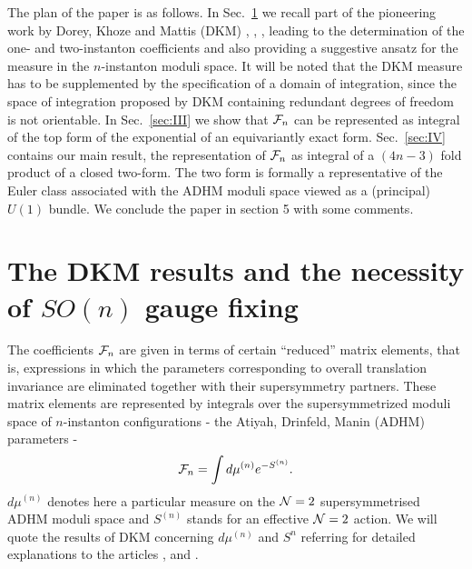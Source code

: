 \documentclass[a4paper,12pt]{article}
\begin{document}
The plan of the paper is as follows. In Sec.~\ref{sec:II} we recall 
part of the pioneering work by Dorey, 
Khoze and Mattis (DKM) \cite{dorey1}, \cite{dorey2}, \cite{dorey3}, 
leading to the determination of the one- and two-instanton 
coefficients \cite{dorey1}  and also providing a suggestive ansatz
for the measure in the $n$-instanton moduli space\cite{dorey3}. It 
will be noted that the DKM measure has to be supplemented by the 
specification of a domain of integration, since the space of 
integration proposed by DKM containing redundant degrees of 
freedom is not orientable. In Sec.~\ref{sec:III} we show that ${\cal F}_n$ 
can be represented as integral 
of the top form of the exponential of an 
equivariantly exact form.  Sec.~\ref{sec:IV} contains our main 
result, the representation of ${\cal F}_n$ as integral of a 
$(4n-3)$ fold product of a closed two-form. The two form is formally 
a representative of the Euler class associated with the ADHM moduli 
space viewed as a (principal) $U(1)$ bundle. 
We conclude the paper in section 5 with 
some comments. 

\section{The DKM results and the necessity of $SO(n)$ gauge 
fixing}\label{sec:II}
The coefficients ${\cal F}_n$ are given in terms of certain ``reduced'' 
matrix elements, that is, expressions in which the parameters 
corresponding to overall translation invariance are eliminated 
together with their supersymmetry partners. These matrix 
elements are represented by integrals over the supersymmetrized 
moduli space of $n$-instanton configurations - the Atiyah, Drinfeld, 
Manin (ADHM) \cite{adhm} parameters - 
\begin{equation}
{\cal F}_n=\int d\mu^{(n)}e^{-S^{(n)}}.
\label{modspaceint}
\end{equation}
$d\mu^{(n)}$ denotes here a particular measure on the ${\cal N}=2$ 
supersymmetrised ADHM moduli space and $S^{(n)}$ stands for an 
effective ${\cal N}=2$ action. We will quote the results of 
DKM concerning $d\mu^{(n)}$ and $S^{n}$ referring for detailed 
explanations to the articles \cite{dorey1}, \cite{dorey2} and  
\cite{dorey3}. 
\end{document}

